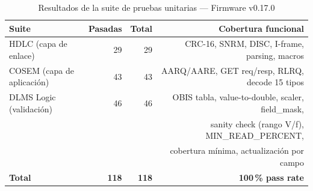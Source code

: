 
\begin{table}[htbp]
\centering
\caption{Resultados de la suite de pruebas unitarias — Firmware v0.17.0}
\label{tab:unit-tests-v017}
\begin{tabular}{l r r r}
\toprule
\textbf{Suite} & \textbf{Pasadas} & \textbf{Total} & \textbf{Cobertura funcional} \\
\midrule
HDLC (capa de enlace) & 29 & 29 & CRC-16, SNRM, DISC, I-frame, parsing, macros \\
COSEM (capa de aplicación) & 43 & 43 & AARQ/AARE, GET req/resp, RLRQ, decode 15 tipos \\
DLMS Logic (validación) & 46 & 46 & OBIS tabla, value-to-double, scaler, field\_mask, \\
 & & & sanity check (rango V/f), MIN\_READ\_PERCENT, \\
 & & & cobertura mínima, actualización por campo \\
\midrule
\textbf{Total} & \textbf{118} & \textbf{118} & \textbf{100\,\% pass rate} \\
\bottomrule
\end{tabular}
\end{table}
